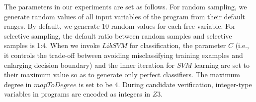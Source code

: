 The parameters in our experiments are set as follows. 
For random sampling, we generate random values of all input variables of the program from their default ranges. 
By default, we generate 10 random values for each free variable.
For selective sampling, the default ratio between random samples and selective samples is 1:4.
When we invoke $\mathit{LibSVM}$ for classification, the parameter $C$ (i.e., it controls the trade-off between avoiding misclassifying training examples and enlarging decision boundary) 
and the inner iteration for $\mathit{SVM}$ learning are set to their maximum value so as to generate only perfect classifiers.
The maximum degree in $\mathit{mapToDegree}$ is set to be 4. 
During candidate verification, integer-type variables in programs are encoded as integers in $\mathit{Z3}$.
%
%


